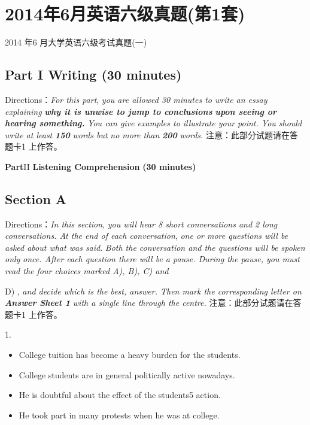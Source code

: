 \documentclass[UTF8,11pt]{ctexart}
\begin{document}
\section*{2014年6月英语六级真题(第1套)}
2014 年6 月大学英语六级考试真题(一)


\subsection*{\textbf{Part I} \textbf{Writing} \textbf{(30 minutes)}}


Directions：\textit{For this part},\textit{ you are allowed 30 minutes to write an essay explaining}\textbf{\textit{ why it is unwise to jump to conclusions}} \textbf{\textit{upon seeing or hearing something.}}\textit{ You can give examples to illustrate your point. You should write at least}\textbf{\textit{ 150}}\textit{ words but} \textit{no more than}\textbf{\textit{ 200}}\textit{ words.} 注意：此部分试题请在答题卡1 上作答。


\textbf{Part}II \textbf{Listening Comprehension} \textbf{(30 minutes)}


\subsection*{\textbf{Section A}}


Directions：\textit{In this section},\textit{ you will hear 8 short conversations and 2 long conversations. At the end of each conversation}, \textit{one or more questions will be asked about what was said}.\textit{ Both the conversation and the questions will be spoken only} \textit{once. After each question there will be a pause. During the pause, you must read the four choices marked A), B), C) and}


D) ,\textit{ and decide which is the best, answer. Then mark the corresponding letter on}\textbf{\textit{ Answer Sheet 1}}\textit{ with a single line} \textit{through the centre.} 注意：此部分试题请在答题卡1 上作答。


1.


\begin{itemize}[leftmargin=2em,itemsep=.2em,topsep=.4em]\item[A.] College tuition has become a heavy burden for the students.
\item[B.] College students are in general politically active nowadays.
\item[C.] He is doubtful about the effect of the students5 action.
\item[D.] He took part in many protests when he was at college.
\end{itemize}
\end{document}
